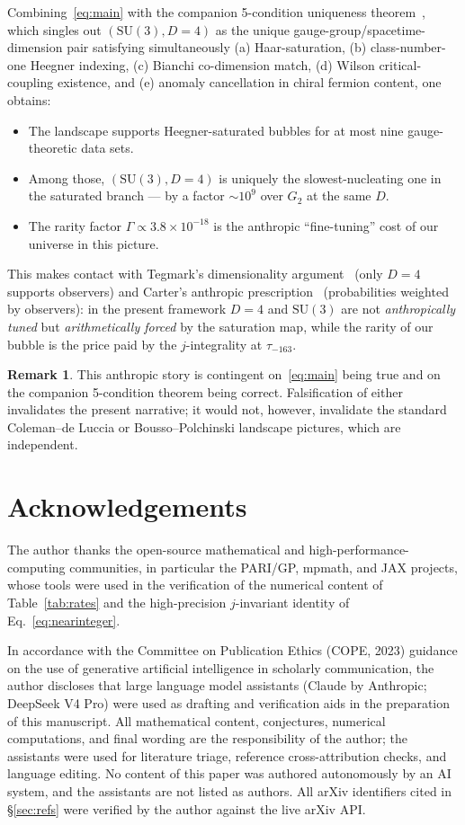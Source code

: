 \documentclass[11pt,a4paper]{article}
\theoremstyle{plain}
\theoremstyle{definition}
\newtheorem*{remark}{Remark}
\newcommand{\SU}{\mathrm{SU}}
\begin{document}
Combining~\eqref{eq:main} with the companion 5-condition uniqueness theorem~\cite{Companion1}, which singles out $(\SU(3),D{=}4)$ as the unique gauge-group/spacetime-dimension pair satisfying simultaneously (a) Haar-saturation, (b) class-number-one Heegner indexing, (c) Bianchi co-dimension match, (d) Wilson critical-coupling existence, and (e) anomaly cancellation in chiral fermion content, one obtains:
\begin{itemize}
\setlength\itemsep{0pt}
\item The landscape supports Heegner-saturated bubbles for at most nine gauge-theoretic data sets.
\item Among those, $(\SU(3),D{=}4)$ is uniquely the slowest-nucleating one in the saturated branch --- by a factor $\sim 10^9$ over $G_2$ at the same $D$.
\item The rarity factor $\Gamma\propto 3.8\times 10^{-18}$ is the anthropic ``fine-tuning'' cost of our universe in this picture.
\end{itemize}
This makes contact with Tegmark's dimensionality argument~\cite{Tegmark1997} (only $D=4$ supports observers) and Carter's anthropic prescription~\cite{Carter2006} (probabilities weighted by observers): in the present framework $D=4$ and $\SU(3)$ are not \emph{anthropically tuned} but \emph{arithmetically forced} by the saturation map, while the rarity of our bubble is the price paid by the $j$-integrality at $\tau_{-163}$.

\begin{remark}
This anthropic story is contingent on~\eqref{eq:main} being true and on the companion 5-condition theorem being correct. Falsification of either invalidates the present narrative; it would not, however, invalidate the standard Coleman--de Luccia or Bousso--Polchinski landscape pictures, which are independent.
\end{remark}

\section{Acknowledgements}\label{sec:ack}

The author thanks the open-source mathematical and high-performance-computing communities, in particular the PARI/GP, mpmath, and JAX projects, whose tools were used in the verification of the numerical content of Table~\ref{tab:rates} and the high-precision $j$-invariant identity of Eq.~\eqref{eq:nearinteger}.

In accordance with the Committee on Publication Ethics (COPE, 2023) guidance on the use of generative artificial intelligence in scholarly communication, the author discloses that large language model assistants (Claude by Anthropic; DeepSeek V4 Pro) were used as drafting and verification aids in the preparation of this manuscript. All mathematical content, conjectures, numerical computations, and final wording are the responsibility of the author; the assistants were used for literature triage, reference cross-attribution checks, and language editing. No content of this paper was authored autonomously by an AI system, and the assistants are not listed as authors. All arXiv identifiers cited in \S\ref{sec:refs} were verified by the author against the live arXiv API.
\end{document}
